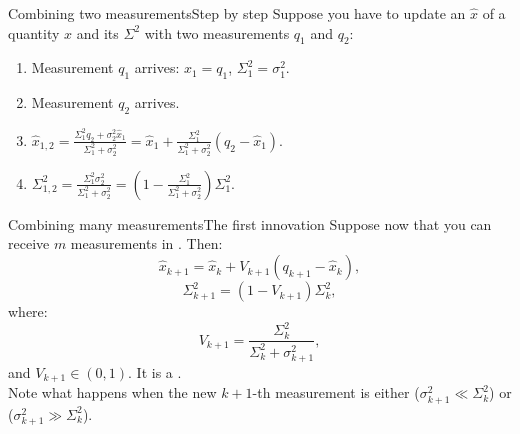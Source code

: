\begin{frame}{Combining two measurements}{Step by step}
  Suppose you have to update an  $\hat{x}$ of a quantity $x$ and its  $\Sigma^2$ with two measurements $q_1$ and $q_2$:
  \begin{enumerate}
    \item Measurement $q_1$ arrives: $\hat{x}_1 = q_1$, $\Sigma_1^2=\sigma_1^2$.
    \item Measurement $q_2$ arrives.
    \item $\hat{x}_{1,2} = \frac{\Sigma_1^2 q_2 + \sigma_2^2 \hat{x}_1}{\Sigma_1^2 + \sigma_2^2} = \hat{x}_1 + \frac{\Sigma_1^2}{\Sigma_1^2+\sigma_2^2}(q_2 - \hat{x}_1)$.
    \item $\Sigma_{1,2}^2 = \frac{\Sigma_1^2 \sigma_2^2}{\Sigma_1^2 + \sigma_2^2} = (1-\frac{\Sigma_1^2}{\Sigma_1^2+\sigma_2^2})\Sigma_1^2$.
  \end{enumerate}
\end{frame}

\begin{frame}{Combining many measurements}{The first innovation}
  Suppose now that you can receive $m$ measurements in . Then:
  \begin{equation}
    \hat{x}_{k+1} = \hat{x}_k + V_{k+1}(q_{k+1} - \hat{x}_k),
  \end{equation}
  \begin{equation}
    \Sigma_{k+1}^2 = (1 - V_{k+1})\Sigma_k^2,
  \end{equation}
  where:
  \begin{equation}
    V_{k+1} = \frac{\Sigma_k^2}{\Sigma_k^2 + \sigma_{k+1}^2},
  \end{equation}
  and $V_{k+1} \in (0,1)$. It is a .\\
  Note what happens when the new $k+1$-th measurement is either  ($\sigma_{k+1}^2 \ll \Sigma_k^2$) or  ($\sigma_{k+1}^2 \gg \Sigma_k^2$).
\end{frame}

